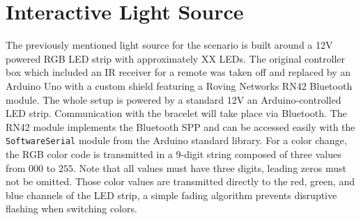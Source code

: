 \chapter{Interactive Light Source}

The previously mentioned light source for the scenario is built around a 12V powered RGB \ac{LED} strip with approximately XX \ac{LED}s. The original controller box which included an \ac{IR} receiver for a remote was taken off and replaced by an Arduino Uno with a custom shield featuring a Roving Networks RN42 Bluetooth module. The whole setup is powered by a standard 12V an Arduino-controlled LED strip. Communication with the bracelet will take place via Bluetooth. The RN42 module implements the Bluetooth \ac{SPP} and can be accessed easily with the \texttt{SoftwareSerial} module from the Arduino standard library. For a color change, the RGB color code is transmitted in a 9-digit string composed of three values from $000$ to $255$. Note that all values must have three digits, leading zeros must not be omitted. Those color values are transmitted directly to the red, green, and blue channels of the \ac{LED} strip, a simple fading algorithm prevents disruptive flashing when switching colors.